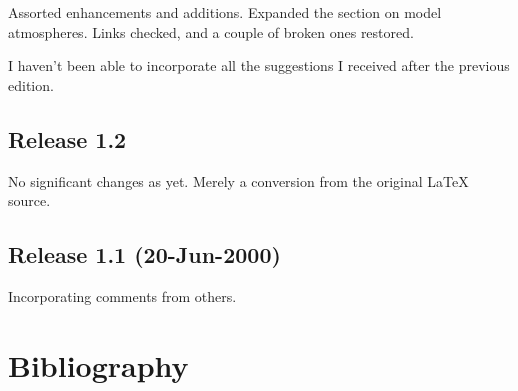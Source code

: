 \documentclass[11pt,oneside,chapters]{starlink}
\begin{document}
Assorted enhancements and additions.  Expanded the section on model
atmospheres.  Links checked, and a couple of broken ones restored.

I haven't been able to incorporate all the suggestions I received
after the previous edition.

\section{Release 1.2}
\label{rel-1.2}

No significant changes as yet.  Merely a conversion from the
original LaTeX source.

\section{Release 1.1 (20-Jun-2000)}

Incorporating comments from others.

\chapter{Bibliography}



\end{document}
